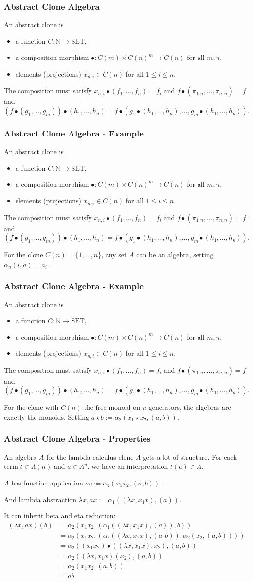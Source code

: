 \documentclass[aspectratio=169]{fancyslides} %
\newcommand\abstractCloneDefinition{
  \begin{definition}
    An abstract clone is
    \begin{itemize}
      \item a function $ C : \mathbb N \to \mathrm{SET} $,
      \item a composition morphism $ \bullet: C(m) \times C(n)^m \to C(n) $ for all $ m, n $,
      \item elements (projections) $ x_{n, i} \in C(n) $ for all $ 1 \leq i \leq n $.
    \end{itemize}
    The composition must satisfy $ x_{n, i} \bullet (f_1, \dots, f_n) = f_i $ and $ f \bullet (\pi_{1, n}, \dots, \pi_{n, n}) = f $ and
    \[ (f \bullet (g_1, \dots, g_m)) \bullet (h_1, \dots, h_n) = f \bullet (g_1 \bullet (h_1, \dots, h_n), \dots, g_m \bullet (h_1, \dots, h_n)). \]
  \end{definition}
}
\begin{document}
  \begin{frame}
    \frametitle{Abstract Clone Algebra}

    \abstractCloneDefinition
  \end{frame}

  \begin{frame}
    \frametitle{Abstract Clone Algebra - Example}

    \abstractCloneDefinition

    \begin{example}
      For the clone $ C(n) = \{ 1, \dots, n \} $, any set $ A $ can be an algebra, setting $ \alpha_n(i, a) = a_i $.
    \end{example}
  \end{frame}

  \begin{frame}
    \frametitle{Abstract Clone Algebra - Example}

    \abstractCloneDefinition

    \begin{example}
      For the clone with $ C(n) $ the free monoid on $ n $ generators, the algebras are exactly the monoids. Setting $ a \star b := \alpha_2(x_1 \star x_2, (a, b)) $.
    \end{example}
  \end{frame}

  \begin{frame}
    \frametitle{Abstract Clone Algebra - Properties}

    \begin{example}
      An algebra $ A $ for the lambda calculus clone $ \Lambda $ gets a lot of structure. For each term $ t \in \Lambda(n) $ and $ a \in A^n $, we have an interpretation $ t(a) \in A $.

      \pause

      $ A $ has function application $ a b := \alpha_2(x_1 x_2, (a, b)) $.

      \pause

      And lambda abstraction $ \lambda x, a x := \alpha_1((\lambda x, x_1 x), (a)) $.

      \pause

      It can inherit beta and eta reduction:
      \begin{align*}
          (\lambda x, a x)(b) &= \alpha_2(x_1 x_2, (\alpha_1((\lambda x, x_1 x), (a)), b))\\
          &= \alpha_2(x_1 x_2, (\alpha_2((\lambda x, x_1 x), (a, b)), \alpha_2(x_2, (a, b))))\\
          &= \alpha_2((x_1 x_2) \bullet ((\lambda x, x_1 x), x_2), (a, b))\\
          &= \alpha_2((\lambda x, x_1 x)(x_2), (a, b))\\
          &= \alpha_2(x_1 x_2, (a, b))\\
          &= a b.\\
      \end{align*}
    \end{example}
  \end{frame}
\end{document}
